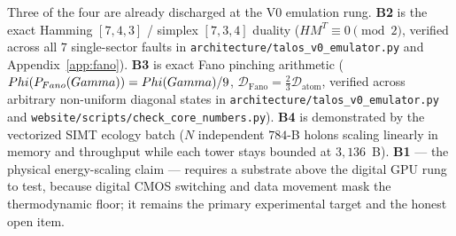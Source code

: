 Three of the four are already discharged at the V0 emulation rung. \textbf{B2}
is the exact Hamming $[7,4,3]$ / simplex $[7,3,4]$ duality ($HM^T\equiv 0\pmod 2$,
verified across all $7$ single-sector faults in
\texttt{architecture/talos\_v0\_emulator.py} and Appendix~\ref{app:fano}).
\textbf{B3} is exact Fano pinching arithmetic
($Phi(P_{Fano}(Gamma))=Phi(Gamma)/9$,
$\mathcal{D}_{\mathrm{Fano}}=\tfrac23\mathcal{D}_{\mathrm{atom}}$, verified
across arbitrary non-uniform diagonal states in
\texttt{architecture/talos\_v0\_emulator.py} and
\texttt{website/scripts/check\_core\_numbers.py}). \textbf{B4} is demonstrated
by the vectorized SIMT ecology batch ($N$ independent $784$-B holons scaling
linearly in memory and throughput while each tower stays bounded at $3{,}136$~B).
\textbf{B1} --- the physical energy-scaling claim --- requires a substrate above
the digital GPU rung to test, because digital CMOS switching and data movement
mask the thermodynamic floor; it remains the primary experimental target and the
honest open item.
